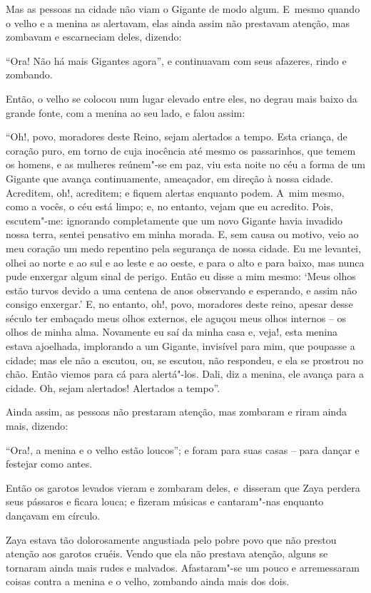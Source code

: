 Mas as pessoas na cidade não viam o Gigante de modo algum. E~mesmo quando o
velho e a menina as alertavam, elas ainda assim não prestavam atenção,
mas zombavam e escarneciam deles, dizendo:

``Ora! Não há mais Gigantes agora'', e continuavam com seus afazeres,
rindo e zombando.

Então, o velho se colocou num lugar elevado entre eles, no degrau mais
baixo da grande fonte, com a menina ao seu lado, e falou assim:

``Oh!, povo, moradores deste Reino, sejam alertados a tempo. Esta
criança, de coração puro, em torno de cuja inocência até mesmo os
passarinhos, que temem os homens, e as mulheres reúnem"-se em paz, viu
esta noite no céu a forma de um Gigante que avança continuamente,
ameaçador, em direção à nossa cidade. Acreditem, oh!, acreditem; e
fiquem alertas enquanto podem. A~mim mesmo, como a vocês, o céu está
limpo; e, no entanto, vejam que eu acredito. Pois, escutem"-me: ignorando
completamente que um novo Gigante havia invadido nossa terra, sentei
pensativo em minha morada. E, sem causa ou motivo, veio ao meu coração
um medo repentino pela segurança de nossa cidade. Eu me levantei, olhei
ao norte e ao sul e ao leste e ao oeste, e para o alto e para baixo, mas
nunca pude enxergar algum sinal de perigo. Então eu disse a mim mesmo:
`Meus olhos estão turvos devido a uma centena de anos observando e
esperando, e assim não consigo enxergar.' E, no entanto, oh!, povo,
moradores deste reino, apesar desse século ter embaçado meus olhos
externos, ele aguçou meus olhos internos -- os olhos de minha alma.
Novamente eu saí da minha casa e, veja!, esta menina estava ajoelhada,
implorando a um Gigante, invisível para mim, que poupasse a cidade; mas
ele não a escutou, ou, se escutou, não respondeu, e ela se prostrou no
chão. Então viemos para cá para alertá"-los. Dali, diz a menina, ele
avança para a cidade. Oh, sejam alertados! Alertados a tempo''.

Ainda assim, as pessoas não prestaram atenção, mas zombaram e riram
ainda mais, dizendo:

``Ora!, a menina e o velho estão loucos''; e foram para suas casas --
para dançar e festejar como antes.

Então os garotos levados vieram e zombaram deles, e~disseram que Zaya
perdera seus pássaros e ficara louca; e fizeram músicas e cantaram"-nas
enquanto dançavam em círculo.

Zaya estava tão dolorosamente angustiada pelo pobre povo que não prestou
atenção aos garotos cruéis. Vendo que ela não prestava atenção, alguns
se tornaram ainda mais rudes e malvados. Afastaram"-se um pouco e
arremessaram coisas contra a menina e o velho, zombando ainda mais dos
dois.

